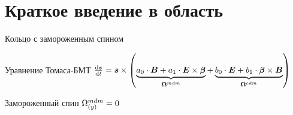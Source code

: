 \documentclass[14pt]{beamer}
\newcommand{\Wedm}{\W^{edm}}
\newcommand{\Wmdm}{\W^{mdm}}
\begin{document}

\section{Краткое  введение в область}

\begin{frame}{Кольцо с замороженным спином}
\begin{block}{Уравнение Томаса-БМТ}
	$\frac{\rd \vec s}{\rd t} = \vec s \times \bkt{\underbrace{a_0\cdot\vec B + a_1\cdot\vec E\times\vec\beta}_{\vec\Wmdm} + \underbrace{b_0\cdot\vec E + b_1\cdot\vec\beta\times\vec B}_{\vec\Wedm}}$
\end{block}
\begin{block}{Замороженный спин}
	$\Wmdm_{(y)} = 0$
\end{block}
\end{frame}
\end{document}
